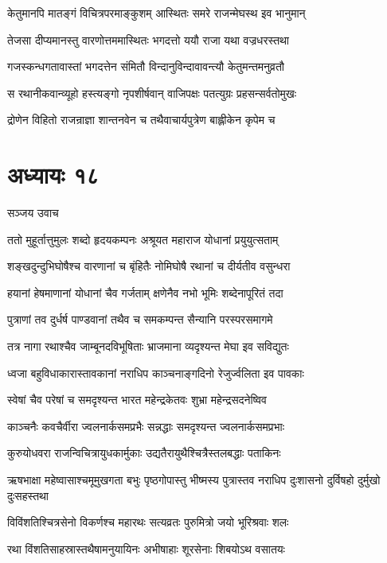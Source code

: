 \twolineshloka
{केतुमानपि मातङ्गं विचित्रपरमाङ्कुशम्}
{आस्थितः समरे राजन्मेघस्थ इव भानुमान्}


\twolineshloka
{तेजसा दीप्यमानस्तु वारणोत्तममास्थितः}
{भगदत्तो ययौ राजा यथा वज्रधरस्तथा}


\twolineshloka
{गजस्कन्धगतावास्तां भगदत्तेन संमितौ}
{विन्दानुविन्दावावन्त्यौ केतुमन्तमनुव्रतौ}


\twolineshloka
{स रथानीकवान्व्यूहो हस्त्यङ्गो नृपशीर्षवान्}
{वाजिपक्षः पतत्युग्रः प्रहसन्सर्वतोमुखः}


\twolineshloka
{द्रोणेन विहितो राजन्राज्ञा शान्तनवेन च}
{तथैवाचार्यपुत्रेण बाह्लीकेन कृपेम च}


\chapter{अध्यायः १८}
\twolineshloka
{सञ्जय उवाच}
{}


\twolineshloka
{ततो मुहूर्तात्तुमुलः शब्दो हृदयकम्पनः}
{अश्रूयत महाराज योधानां प्रयुयुत्सताम्}


\twolineshloka
{शङ्खदुन्दुभिघोषैश्च वारणानां च बृंहितैः}
{नोमिघोषै रथानां च दीर्यतीव वसुन्धरा}


\twolineshloka
{हयानां हेषमाणानां योधानां चैव गर्जताम्}
{क्षणेनैव नभो भूमिः शब्देनापूरितं तदा}


\twolineshloka
{पुत्राणां तव दुर्धर्ष पाण्डवानां तथैव च}
{समकम्पन्त सैन्यानि परस्परसमागमे}


\twolineshloka
{तत्र नागा रथाश्चैव जाम्बूनदविभूषिताः}
{भ्राजमाना व्यदृश्यन्त मेघा इव सविद्युतः}


\twolineshloka
{ध्वजा बहुविधाकारास्तावकानां नराधिप}
{काञ्चनाङ्गदिनो रेजुर्ज्वलिता इव पावकाः}


\twolineshloka
{स्वेषां चैव परेषां च समदृश्यन्त भारत}
{महेन्द्रकेतवः शुभ्रा महेन्द्रसदनेष्विव}


\twolineshloka
{काञ्चनैः कवचैर्वीरा ज्वलनार्कसमप्रभैः}
{सन्नद्धाः समदृश्यन्त ज्वलनार्कसमप्रभाः}


\twolineshloka
{कुरुयोधवरा राजन्विचित्रायुधकार्मुकाः}
{उद्यतैरायुथैश्चित्रैस्तलबद्धाः पताकिनः}


\threelineshloka
{ऋषभाक्षा महेष्वासाश्चमूमुखगता बभुः}
{पृष्ठगोपास्तु भीष्मस्य पुत्रास्तव नराधिप}
{दुःशासनो दुर्विषहो दुर्मुखो दुःसहस्तथा}


\twolineshloka
{विविंशतिश्चित्रसेनो विकर्णश्च महारथः}
{सत्यव्रतः पुरुमित्रो जयो भूरिश्रवाः शलः}


\twolineshloka
{रथा विंशतिसाहस्रास्तथैषामनुयायिनः}
{अभीषाहाः शूरसेनाः शिबयोऽथ वसातयः}


